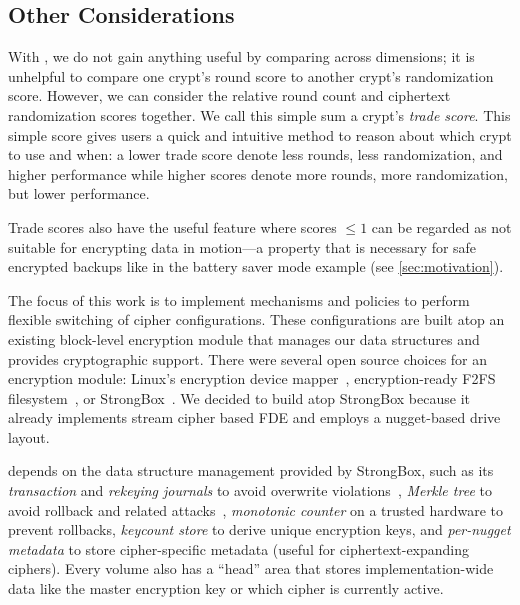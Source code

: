 \subsection{Other Considerations}\label{subsec:des-discussion}



 With \sysC, we do not gain anything useful by comparing
across dimensions; \ie it is unhelpful to compare one crypt's round score to
another crypt's randomization score. However, we can consider the relative round
count and ciphertext randomization scores together. We call this simple sum a
crypt's {\em trade score}. This simple score gives users a quick and intuitive
method to reason about which crypt to use and when: a lower trade score denote
less rounds, less randomization, and higher performance while higher scores
denote more rounds, more randomization, but lower performance.

Trade scores also have the useful feature where scores $\leq1$ can be regarded
as not suitable for encrypting data in motion---a property that is necessary for
safe encrypted backups like in the battery saver mode example (see
\cref{sec:motivation}).


 The focus of this work is to implement
mechanisms and policies to perform flexible switching of cipher configurations.
These configurations are built atop an existing block-level encryption module
that manages our data structures and provides cryptographic support. There were
several open source choices for an encryption module: Linux's encryption device
mapper~\cite{dmcrypt,DmC-Android}, encryption-ready F2FS filesystem~\cite{F2FS},
or StrongBox~\cite{StrongBox}. We decided to build \sys atop StrongBox because
it already implements stream cipher based FDE and employs a nugget-based drive
layout.

\sys depends on the data structure management provided by StrongBox, such as its
{\em transaction} and {\em rekeying journals} to avoid overwrite
violations~\cite{StrongBox}, {\em Merkle tree} to avoid rollback and related
attacks~\cite{StrongBox}, {\em monotonic counter} on a trusted hardware to
prevent rollbacks, {\em keycount store} to derive unique encryption keys, and
{\em per-nugget metadata} to store cipher-specific metadata (useful for
ciphertext-expanding ciphers). Every \sys volume also has a ``head'' area that
stores implementation-wide data like the master encryption key or which cipher
is currently active.


